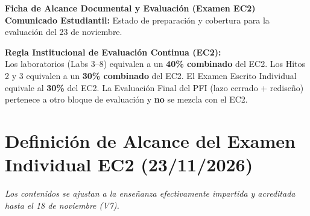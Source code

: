 \documentclass[10pt, a4paper]{article}
\begin{document}
\begin{center}
    {\Large\textbf{\textcolor{ucbblue}{Ficha de Alcance Documental y Evaluación (Examen EC2)}}} \\[0.1cm]
    {\footnotesize\textbf{Comunicado Estudiantil:} Estado de preparación y cobertura para la evaluación del 23 de noviembre.}
\end{center}

\begin{tcolorbox}[colback=blue!5, colframe=ucbblue, boxsep=2pt, top=3pt, bottom=3pt]
    \small \textbf{Regla Institucional de Evaluación Continua (EC2):} \\
    Los laboratorios (Labs 3--8) equivalen a un \textbf{40\% combinado} del EC2. Los Hitos 2 y 3 equivalen a un \textbf{30\% combinado} del EC2. El Examen Escrito Individual equivale al \textbf{30\%} del EC2. La Evaluación Final del PFI (lazo cerrado + rediseño) pertenece a otro bloque de evaluación y \textbf{no} se mezcla con el EC2.
\end{tcolorbox}

\section*{Definición de Alcance del Examen Individual EC2 (23/11/2026)}
\textit{Los contenidos se ajustan a la enseñanza efectivamente impartida y acreditada hasta el 18 de noviembre (V7).}
\end{document}
